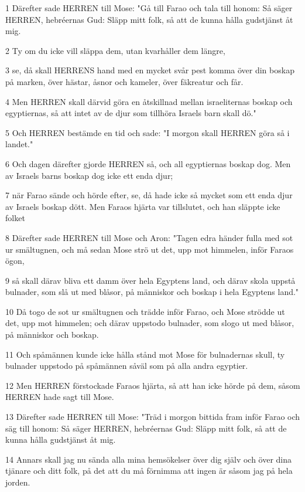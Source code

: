 \par 1 Därefter sade HERREN till Mose: "Gå till Farao och tala till honom: Så säger HERREN, hebréernas Gud: Släpp mitt folk, så att de kunna hålla gudstjänst åt mig.
\par 2 Ty om du icke vill släppa dem, utan kvarhåller dem längre,
\par 3 se, då skall HERRENS hand med en mycket svår pest komma över din boskap på marken, över hästar, åsnor och kameler, över fäkreatur och får.
\par 4 Men HERREN skall därvid göra en åtskillnad mellan israeliternas boskap och egyptiernas, så att intet av de djur som tillhöra Israels barn skall dö."
\par 5 Och HERREN bestämde en tid och sade: "I morgon skall HERREN göra så i landet."
\par 6 Och dagen därefter gjorde HERREN så, och all egyptiernas boskap dog. Men av Israels barns boskap dog icke ett enda djur;
\par 7 när Farao sände och hörde efter, se, då hade icke så mycket som ett enda djur av Israels boskap dött. Men Faraos hjärta var tillslutet, och han släppte icke folket
\par 8 Därefter sade HERREN till Mose och Aron: "Tagen edra händer fulla med sot ur smältugnen, och må sedan Mose strö ut det, upp mot himmelen, inför Faraos ögon,
\par 9 så skall därav bliva ett damm över hela Egyptens land, och därav skola uppstå bulnader, som slå ut med blåsor, på människor och boskap i hela Egyptens land."
\par 10 Då togo de sot ur smältugnen och trädde inför Farao, och Mose strödde ut det, upp mot himmelen; och därav uppstodo bulnader, som slogo ut med blåsor, på människor och boskap.
\par 11 Och spåmännen kunde icke hålla stånd mot Mose för bulnadernas skull, ty bulnader uppstodo på spåmännen såväl som på alla andra egyptier.
\par 12 Men HERREN förstockade Faraos hjärta, så att han icke hörde på dem, såsom HERREN hade sagt till Mose.
\par 13 Därefter sade HERREN till Mose: "Träd i morgon bittida fram inför Farao och säg till honom: Så säger HERREN, hebréernas Gud: Släpp mitt folk, så att de kunna hålla gudstjänst åt mig.
\par 14 Annars skall jag nu sända alla mina hemsökelser över dig själv och över dina tjänare och ditt folk, på det att du må förnimma att ingen är såsom jag på hela jorden.
